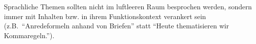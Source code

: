Sprachliche Themen sollten nicht im luftleeren Raum besprochen werden, sondern immer mit Inhalten bzw. in ihrem Funktionskontext verankert sein (z.B.\ ``Anredeformeln anhand von Briefen'' statt ``Heute thematisieren wir Kommaregeln.'').